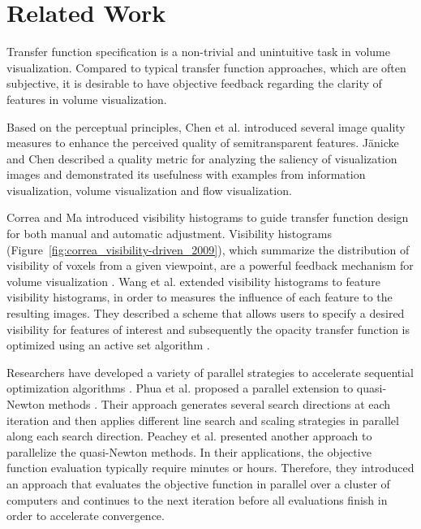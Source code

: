 \section{Related Work}
Transfer function specification is a non-trivial and unintuitive task in volume visualization. Compared to typical transfer function approaches, which are often subjective, it is desirable to have objective feedback regarding the clarity of features in volume visualization.

Based on the perceptual principles, Chen et al. \cite{chan_perception-based_2009} introduced several image quality measures to enhance the perceived quality of semitransparent features.
J{\"a}nicke and Chen \cite{janicke_salience-based_2010} described a quality metric for analyzing the saliency of visualization images and demonstrated its usefulness with examples from information visualization, volume visualization and flow visualization.

Correa and Ma \cite{correa_visibility-driven_2009} introduced visibility histograms to guide transfer function design for both manual and automatic adjustment.
Visibility histograms (Figure~\ref{fig:correa_visibility-driven_2009}), which summarize the distribution of visibility of voxels from a given viewpoint, are a powerful feedback mechanism for volume visualization \cite{emsenhuber_visibility_2008}.
Wang et al. \cite{wang_efficient_2011} extended visibility histograms to feature visibility histograms, in order to measures the influence of each feature to the resulting images. They described a scheme that allows users to specify a desired visibility for features of interest and subsequently the opacity transfer function is optimized using an active set algorithm \cite{polyak_conjugate_1969}.


Researchers have developed a variety of parallel strategies to accelerate sequential optimization algorithms \cite{spedicato_algorithms_2012}.
Phua et al. \cite{phua_parallel_1998} proposed a parallel extension to quasi-Newton methods \cite{yang_optimization_2001}. Their approach generates several search directions at each iteration and then applies different line search and scaling strategies in parallel along each search direction.
Peachey et al. \cite{peachey_parallel_2009} presented another approach to parallelize the quasi-Newton methods.
In their applications, the objective function evaluation typically require minutes or hours. Therefore, they introduced an approach that evaluates the objective function in parallel over a cluster of computers and continues to the next iteration before all evaluations finish in order to accelerate convergence.

